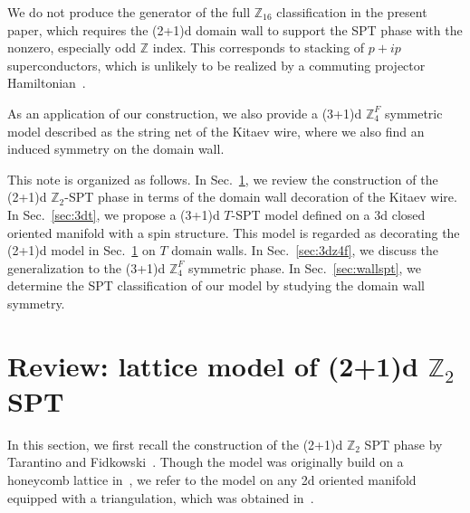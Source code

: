 \documentclass[12pt]{article}
\numberwithin{equation}{section}
\begin{document}
We do not produce the generator of the full $\mathbb{Z}_{16}$ classification in the present paper, which requires the (2+1)d domain wall to support the SPT phase with the nonzero, especially odd $\mathbb{Z}$ index. This corresponds to stacking of $p+ip$ superconductors, which is unlikely to be realized by a commuting projector Hamiltonian~\cite{Spodyneiko}.

As an application of our construction, we also provide a (3+1)d $\mathbb{Z}_4^F$ symmetric model described as the string net of the Kitaev wire, where we also find an induced symmetry on the domain wall.

This note is organized as follows. In Sec.~\ref{sec:tarantino}, we review the construction of the (2+1)d $\mathbb{Z}_2$-SPT phase in terms of the domain wall decoration of the Kitaev wire. 
In Sec.~\ref{sec:3dt}, we propose a (3+1)d $T$-SPT model defined on a 3d closed oriented manifold with a spin structure. This model is regarded as decorating the (2+1)d model in Sec.~\ref{sec:tarantino} on $T$ domain walls.
In Sec.~\ref{sec:3dz4f}, we discuss the generalization to the (3+1)d $\mathbb{Z}_4^F$ symmetric phase. In Sec.~\ref{sec:wallspt}, we determine the SPT classification of our model by studying the domain wall symmetry. 



\section{Review: lattice model of (2+1)d $\mathbb{Z}_2$ SPT}
\label{sec:tarantino}
In this section, we first recall the construction of the (2+1)d $\mathbb{Z}_2$ SPT phase by Tarantino and Fidkowski~\cite{Tarantino}. Though the model was originally build on a honeycomb lattice in~\cite{Tarantino}, we refer to the model on any 2d oriented manifold equipped with a triangulation, which was obtained in~\cite{wanggu1703}. 
\end{document}

